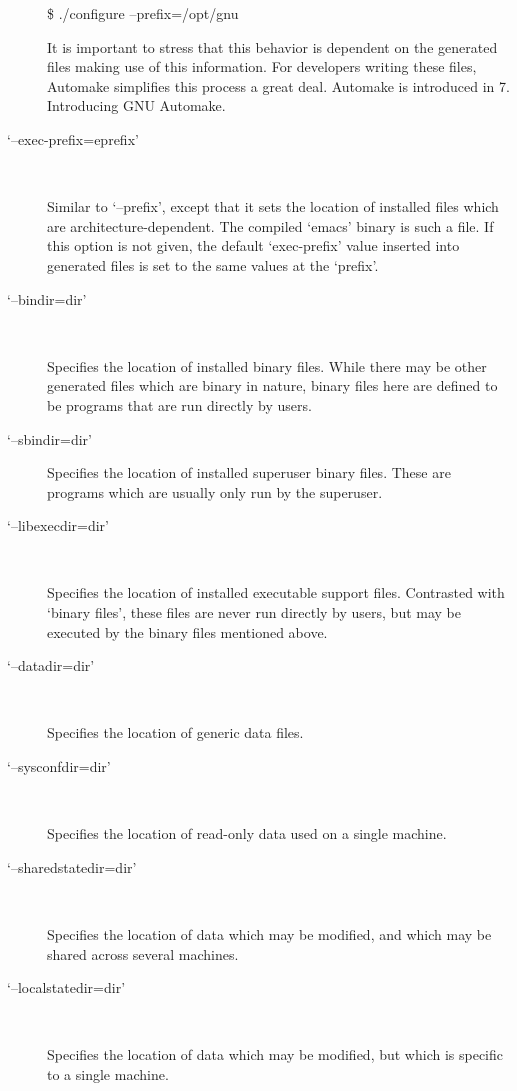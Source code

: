 \begin{description}
 
        \$ ./configure --prefix=/opt/gnu



 It is important to stress that this behavior is dependent on the generated files making use of this information. For developers writing these files, Automake simplifies this process a great deal. Automake is introduced in 7. Introducing GNU Automake. 


\item[`--exec-prefix=eprefix']
\ %

Similar to `--prefix', except that it sets the location of installed files which are architecture-dependent. The compiled `emacs' binary is such a file. If this option is not given, the default `exec-prefix' value inserted into generated files is set to the same values at the `prefix'. 

\item[`--bindir=dir']
\ %

Specifies the location of installed binary files. While there may be other generated files which are binary in nature, binary files here are defined to be programs that are run directly by users. 

\item[`--sbindir=dir']
Specifies the location of installed superuser binary files. These are programs which are usually only run by the superuser. 

\item[`--libexecdir=dir']
\ %

Specifies the location of installed executable support files. Contrasted with `binary files', these files are never run directly by users, but may be executed by the binary files mentioned above. 

\item[`--datadir=dir']
\ %

Specifies the location of generic data files. 

\item[`--sysconfdir=dir']
\ %

Specifies the location of read-only data used on a single machine. 

\item[`--sharedstatedir=dir']
\ %

Specifies the location of data which may be modified, and which may be shared across several machines. 

\item[`--localstatedir=dir']
\ %

Specifies the location of data which may be modified, but which is specific to a single machine. 


\end{description}
